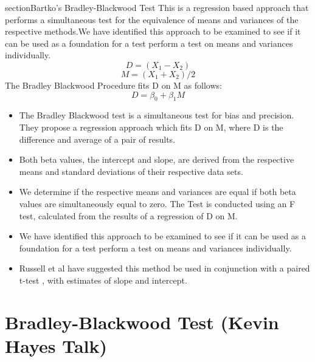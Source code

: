 \documentclass[12pt, a4paper]{report}
\theoremstyle{plain}
\theoremstyle{definition}
\theoremstyle{remark}
\begin{document}
	section{Bartko's Bradley-Blackwood Test}
	This is a regression based
	approach that performs a simultaneous test for the equivalence of
	means and variances of the respective methods.We have identified
	this approach  to be examined to see if it can be used as a
	foundation for a test perform a test on
	means and variances individually.
	\begin{equation}
		D = (X_{1}-X_{2})
	\end{equation}
	\begin{equation}
		M = (X_{1} + X_{2}) /2
	\end{equation}
	The Bradley Blackwood Procedure fits D on M as follows:\\
	\begin{equation}
		D = \beta_{0} + \beta_{1}M
	\end{equation}
	\begin{itemize}
		\item The Bradley Blackwood test is a simultaneous test for bias and
		precision. They propose a regression approach which fits D on M,
		where D is the difference and average of a pair of results.
		\item Both beta values, the intercept and slope, are derived from the respective means and
		standard deviations of their respective data sets.
		\item We determine if the respective means and variances are equal if
		both beta values are simultaneously equal to zero. The Test is
		conducted using an F test, calculated from the results of a
		regression of D on M.
		\item We have identified this approach  to be examined to see if it can
		be used as a foundation for a test perform a test on means and
		variances individually.
		\item Russell et al have suggested this method be used in conjunction
		with a paired t-test , with estimates of slope and intercept.
	\end{itemize}
	

	\section{Bradley-Blackwood Test (Kevin Hayes Talk)}
	
\end{document}
